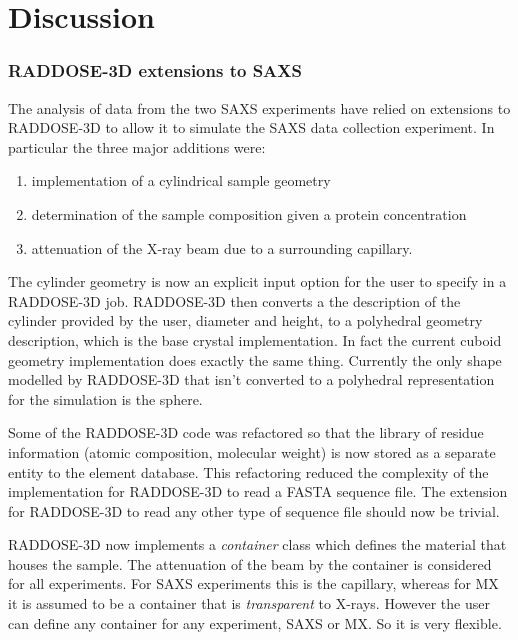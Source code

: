 \section{Discussion}
\label{sec:Discussion}

\subsubsection{RADDOSE-3D extensions to SAXS}
\label{subs:RADDOSE-3D extensions to SAXS}

The analysis of data from the two SAXS experiments have relied on extensions to RADDOSE-3D to allow it to simulate the SAXS data collection experiment.
In particular the three major additions were:
\begin{enumerate}
    \item implementation of a cylindrical sample geometry
    \item determination of the sample composition given a protein concentration
    \item attenuation of the X-ray beam due to a surrounding capillary.
\end{enumerate}
The cylinder geometry is now an explicit input option for the user to specify in a RADDOSE-3D job.
RADDOSE-3D then converts a the description of the cylinder provided by the user, diameter and height, to a polyhedral geometry description, which is the base crystal implementation.
In fact the current cuboid geometry implementation does exactly the same thing.
Currently the only shape modelled by RADDOSE-3D that isn't converted to a polyhedral representation for the simulation is the sphere.

Some of the RADDOSE-3D code was refactored so that the library of residue information (atomic composition, molecular weight) is now stored as a separate entity to the element database. This refactoring reduced the complexity of the implementation for RADDOSE-3D to read a FASTA sequence file. The extension for RADDOSE-3D to read any other type of sequence file should now be trivial.

RADDOSE-3D now implements a \textit{container} class which defines the material that houses the sample.
The attenuation of the beam by the container is considered for all experiments.
For SAXS experiments this is the capillary, whereas for MX it is assumed to be a container that is \textit{transparent} to X-rays.
However the user can define any container for any experiment, SAXS or MX. So it is very flexible.

